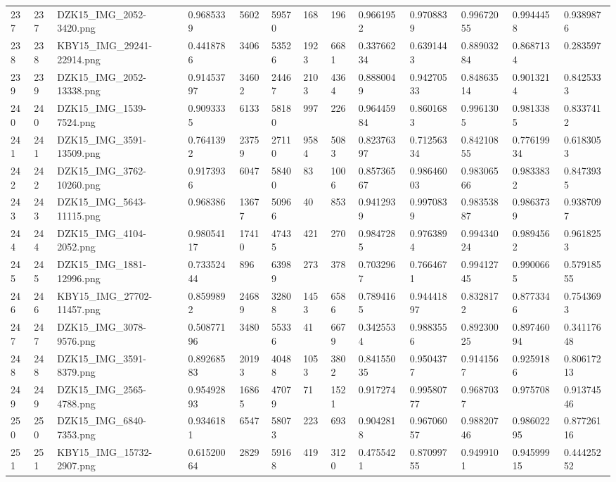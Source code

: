 \documentclass[11pt, a4paper, twoside]{report}
\begin{document}
\begin{longtable}[c]{@{}lllllllllllll@{}}
237 & 237 & DZK15\_IMG\_2052-3420.png & 0.9685339 & 5602 & 59570 & 168 & 196 & 0.9661952 & 0.9708839 & 0.99672055 & 0.9944458 & 0.9389876 \\
238 & 238 & KBY15\_IMG\_29241-22914.png & 0.4418786 & 3406 & 53526 & 1923 & 6681 & 0.33766234 & 0.6391443 & 0.88903284 & 0.8687134 & 0.283597 \\
239 & 239 & DZK15\_IMG\_2052-13338.png & 0.91453797 & 34602 & 24467 & 2103 & 4364 & 0.8880049 & 0.94270533 & 0.84863514 & 0.9013214 & 0.8425333 \\
240 & 240 & DZK15\_IMG\_1539-7524.png & 0.9093335 & 6133 & 58180 & 997 & 226 & 0.96445984 & 0.8601683 & 0.9961305 & 0.9813385 & 0.8337412 \\
241 & 241 & DZK15\_IMG\_3591-13509.png & 0.7641392 & 23759 & 27110 & 9584 & 5083 & 0.82376397 & 0.71256334 & 0.84210855 & 0.77619934 & 0.6183053 \\
242 & 242 & DZK15\_IMG\_3762-10260.png & 0.9173936 & 6047 & 58400 & 83 & 1006 & 0.85736567 & 0.98646003 & 0.98306566 & 0.9833832 & 0.8473935 \\
243 & 243 & DZK15\_IMG\_5643-11115.png & 0.968386 & 13677 & 50966 & 40 & 853 & 0.9412939 & 0.9970839 & 0.98353887 & 0.9863739 & 0.9387097 \\
244 & 244 & DZK15\_IMG\_4104-2052.png & 0.98054117 & 17410 & 47435 & 421 & 270 & 0.9847285 & 0.9763894 & 0.99434024 & 0.9894562 & 0.9618253 \\
245 & 245 & DZK15\_IMG\_1881-12996.png & 0.73352444 & 896 & 63989 & 273 & 378 & 0.7032967 & 0.7664671 & 0.99412745 & 0.9900665 & 0.57918555 \\
246 & 246 & KBY15\_IMG\_27702-11457.png & 0.8599892 & 24689 & 32808 & 1453 & 6586 & 0.7894165 & 0.94441897 & 0.8328172 & 0.8773346 & 0.7543693 \\
247 & 247 & DZK15\_IMG\_3078-9576.png & 0.50877196 & 3480 & 55336 & 41 & 6679 & 0.3425534 & 0.9883556 & 0.89230025 & 0.89746094 & 0.34117648 \\
248 & 248 & DZK15\_IMG\_3591-8379.png & 0.89268583 & 20193 & 40488 & 1053 & 3802 & 0.84155035 & 0.9504377 & 0.9141567 & 0.9259186 & 0.80617213 \\
249 & 249 & DZK15\_IMG\_2565-4788.png & 0.95492893 & 16865 & 47079 & 71 & 1521 & 0.917274 & 0.99580777 & 0.9687037 & 0.975708 & 0.91374546 \\
250 & 250 & DZK15\_IMG\_6840-7353.png & 0.9346181 & 6547 & 58073 & 223 & 693 & 0.9042818 & 0.96706057 & 0.98820746 & 0.98602295 & 0.87726116 \\
251 & 251 & KBY15\_IMG\_15732-2907.png & 0.61520064 & 2829 & 59168 & 419 & 3120 & 0.4755421 & 0.87099755 & 0.9499101 & 0.94599915 & 0.44425252 \\

\end{longtable}
\end{document}
